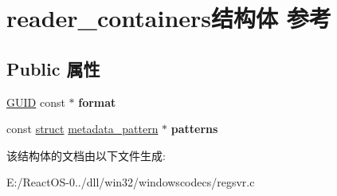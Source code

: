 \hypertarget{structreader__containers}{}\section{reader\+\_\+containers结构体 参考}
\label{structreader__containers}
\subsection*{Public 属性}
\begin{DoxyCompactItemize}
\item 
\mbox{\label{structreader__containers_a82714868aa40e731eab9e6e356b29b76}} 
\hyperlink{interface_g_u_i_d}{G\+U\+ID} const  $\ast$ {\bfseries format}
\item 
\mbox{\label{structreader__containers_a1d77c619e2755c68ddf84975bacd7c7e}} 
const \hyperlink{interfacestruct}{struct} \hyperlink{structmetadata__pattern}{metadata\+\_\+pattern} $\ast$ {\bfseries patterns}
\end{DoxyCompactItemize}


该结构体的文档由以下文件生成\+:\begin{DoxyCompactItemize}
\item 
E\+:/\+React\+O\+S-\/0../dll/win32/windowscodecs/regsvr.\+c\end{DoxyCompactItemize}
